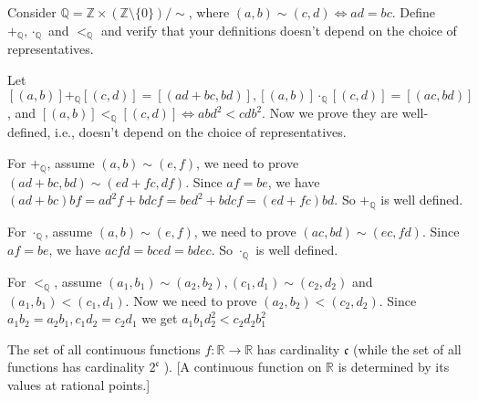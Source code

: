 \documentclass{ctexart}
\newif\ifpreface
\begin{document}
\large
\setlength{\baselineskip}{1.2em}
\ifpreface
	
\else
	\maketitle
\fi
{}
\begin{problem}
Consider \(\mathbb{Q}=\mathbb{Z} \times (\mathbb{Z} \setminus \{0\})/\sim\), where \((a,b)\sim(c,d) \iff ad=bc\).
Define \(+_\mathbb{Q},\cdot_\mathbb{Q}\) and \(<_\mathbb{Q}\) and verify that your definitions
doesn't depend on the choice of representatives.
\end{problem}
\begin{solution}
	Let \([(a,b)]+_\mathbb{Q}[(c,d)]=[(ad+bc,bd)],[(a,b)]\cdot_\mathbb{Q}[(c,d)]=[(ac,bd)]\),
	and \([(a,b)]<_\mathbb{Q} [(c,d)]\iff a b d^2<c d b^2\).
	Now we prove they are well-defined, i.e., doesn't depend on the choice of representatives.

	For \(+_\mathbb{Q}\), assume \((a,b)\sim (e,f)\), we need to prove
	\((ad+bc,bd)\sim (ed+fc,df)\).
	Since \(af=be\), we have \((ad+bc)bf=ad^2f+bdcf=bed^2+bdcf=(ed+fc)bd\).
	So \(+_\mathbb{Q}\) is well defined.

	For \(\cdot_\mathbb{Q}\), assume \((a,b)\sim (e,f)\), we need to prove
	\((ac,bd)\sim (ec,fd)\).
	Since \(af=be\), we have \(acfd=bced=bdec\).
	So \(\cdot_\mathbb{Q}\) is well defined.

	For \(<_\mathbb{Q}\), assume \((a_1,b_1)\sim (a_2,b_2),(c_1,d_1)\sim(c_2,d_2)\) and \((a_1,b_1)<(c_1,d_1)\).
	Now we need to prove \((a_2,b_2)<(c_2,d_2)\).
	Since \(a_1b_2=a_2b_1,c_1d_2=c_2d_1\) we get
	\(a_1 b_1 d_2^2<c_2 d_2 b_1^2\)
\end{solution}

\begin{problem}
The set of all continuous functions $f: \mathbb{R} \rightarrow \mathbb{R}$ has cardinality $\mathfrak{c}$ (while the set of all functions has cardinality $2^{\mathfrak{c}}$ ).
[A continuous function on $\mathbb{R}$ is determined by its values at rational points.]
\end{problem}
\end{document}
